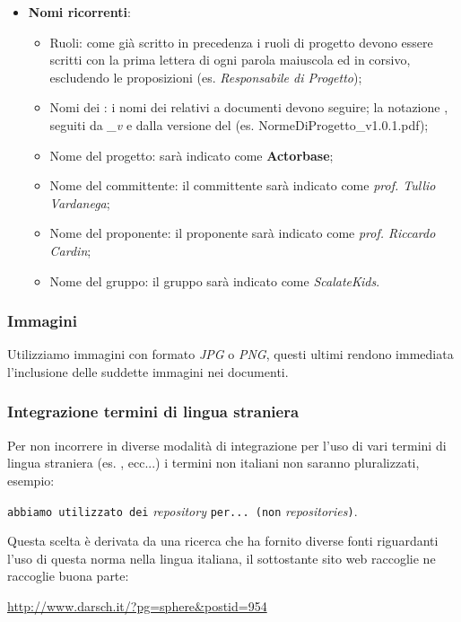 \documentclass{scalatekids-article}
\begin{document}
\begin{itemize}
\item \textbf{Nomi ricorrenti}:
  \begin{itemize}
  \item Ruoli: come già scritto in precedenza i ruoli di progetto devono essere scritti con la prima lettera di ogni parola maiuscola ed in corsivo, escludendo le proposizioni (es. \textit{Responsabile di Progetto});
  \item Nomi dei : i nomi dei  relativi a documenti devono seguire;
    la notazione \textit{}, seguiti da \textit{\_v} e dalla
    versione del  (es. NormeDiProgetto\_v1.0.1.pdf);
  \item Nome del progetto: sarà indicato come \textbf{Actorbase};
  \item Nome del committente: il committente sarà indicato come \textit{prof. Tullio Vardanega};
  \item Nome del proponente: il proponente sarà indicato come \textit{prof. Riccardo Cardin};
  \item Nome del gruppo: il gruppo sarà indicato come \textit{ScalateKids}.
  \end{itemize}
\end{itemize}

\subsubsection{Immagini}
Utilizziamo immagini con formato \textit{JPG} o \textit{PNG}, questi ultimi rendono immediata l'inclusione delle suddette immagini nei documenti.

\subsubsection{Integrazione termini di lingua straniera}
Per non incorrere in diverse modalità di integrazione per l'uso di vari termini di lingua straniera (es. ,  ecc...) i termini non italiani non saranno pluralizzati, esempio:\\
\begin{center}
  \verb=abbiamo utilizzato dei= \textit{repository} \verb=per... (non= \textit{repositories}\verb=)=.
\end{center}
Questa scelta è derivata da una ricerca che ha fornito diverse fonti riguardanti l'uso di questa norma nella lingua italiana, il sottostante sito web raccoglie ne raccoglie buona parte:\\
\begin{center}
  \url{http://www.darsch.it/?pg=sphere&postid=954}
\end{center}
\end{document}
